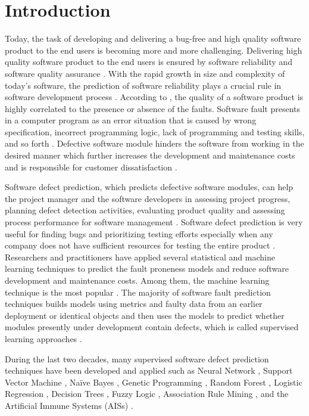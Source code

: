 \documentclass[runningheads,a4paper]{llncs}
\begin{document}
\section{Introduction}

Today, the task of developing and delivering a bug-free and high quality software product to the end users is becoming more and more challenging. Delivering high quality software product to the end users is ensured by software reliability and software quality assurance \cite{rawat2012software}. With the rapid growth in size and complexity of today's software, the prediction of software reliability plays a crucial rule in software development process \cite{zheng2009predicting}. According to \cite{hall2012systematic,arisholm2010systematic}, the quality of a software product is highly correlated to the presence or absence of the faults. Software fault  presents in a computer program as an error situation that is caused by wrong specification, incorrect programming logic, lack of programming and testing skills, and so forth \cite{dowd2006art,abaei2014survey,tomar2016prediction}. Defective software module hinders the software from working in the desired manner which further increases the development and maintenance costs and is responsible for customer dissatisfaction \cite{fenton2000software,fenton2014software}.

Software defect prediction, which predicts defective software modules, can help the project manager and the software developers in assessing project progress, planning defect detection activities, evaluating product quality and assessing process performance for software management \cite{clark2001good}. Software defect prediction is very useful for finding bugs and prioritizing testing efforts especially when any company does not have sufficient resources for testing the entire product \cite{abaei2014survey,wang2016automatically}. Researchers and practitioners have applied several statistical and machine learning techniques to predict the fault proneness models and reduce software development and maintenance costs. Among them, the machine learning technique is the most popular \cite{rawat2012software}. The majority of software fault prediction techniques builds models using metrics and faulty data from an earlier deployment or identical objects and then uses the models to predict whether modules presently under development contain defects, which is called supervised learning approaches \cite{abaei2014survey}.

During the last two decades, many supervised software defect prediction techniques have been developed and applied such as Neural Network \cite{quah2003application}, Support Vector Machine \cite{elish2008predicting}, Naïve Bayes \cite{menzies2007data}, Genetic Programming \cite{evett1998gp}, Random Forest \cite{koru2005building}, Logistic Regression \cite{suffian2014prediction}, Decision Trees \cite{koprinska2007learning}, Fuzzy Logic \cite{yuan2000application}, Association Rule Mining \cite{czibula2014software}, and the Artificial Immune Systems (AISs) \cite{catal2007software2,catal2007software,catal2008fault}. 
\end{document}
